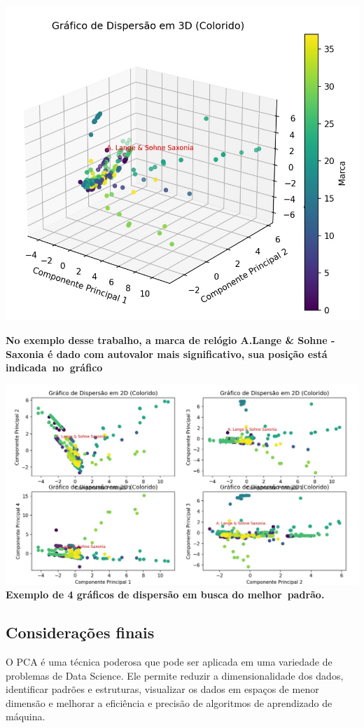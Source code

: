 \documentclass[12pt, a4paper]{article}
\begin{document}
\begin{center}
    \includegraphics[width=14cm]{figura4.jpg}
\end{center}
\textbf{No exemplo desse trabalho, a marca de relógio A.Lange \& Sohne -  Saxonia é  dado com autovalor mais significativo, sua posição está indicada no gráfico}
\begin{center}
    \includegraphics[width=14cm]{figura5.jpg}
    \textbf{Exemplo de 4 gráficos de dispersão em busca do melhor padrão.}
\end{center}
\subsection{Considerações finais}
O PCA é uma técnica poderosa que pode ser aplicada em uma variedade de problemas de Data Science. Ele permite reduzir a dimensionalidade dos dados, identificar padrões e estruturas, visualizar os dados em espaços de menor dimensão e melhorar a eficiência e precisão de algoritmos de aprendizado de máquina.
\end{document}

